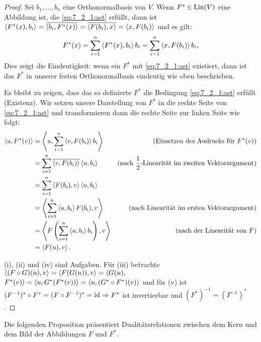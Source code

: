 \begin{proof} 
	Sei $ b_1, \ldots, b_n $ eine Orthonormalbasis von $ V $. Wenn $ F^\ast \in \operatorname{Lin}(V) $ eine Abbildung ist, die \eqref{eq:7_2_1:ast} erfüllt, dann ist $ \left\langle F^\ast(x),b_i \right\rangle = \overline{\left\langle b_i,F^\ast(x) \right\rangle} = \overline{\left\langle F(b_i),x \right\rangle} = \left\langle x,F(b_i) \right\rangle $ und es gilt:
	\begin{equation*}
		F^\ast(x) = \sum_{i=1}^{n} \left\langle F^\ast(x),b_i \right\rangle b_i = \sum_{i=1}^{n} \left\langle x,F(b_i) \right\rangle b_i,
	\end{equation*}
	Dies zeigt die Eindeutigkeit: wenn ein $F^\ast$ mit \eqref{eq:7_2_1:ast} existiert, dann ist das $F^\ast$ in unserer festen Orthonormalbasis eindeutig wie oben beschrieben. 
	
	Es bleibt zu zeigen, dass das so definierte $ F^\ast $ die Bedingung \eqref{eq:7_2_1:ast} erfüllt (Existenz). Wir setzen unsere Darstellung von $F^\ast$ in die rechte Seite von \eqref{eq:7_2_1:ast} und transformieren dann die rechte Seite zur linken Seite wie folgt: 
	\begin{align*}
		\left\langle  u , F^\ast(v)  \right\rangle & = \left\langle  u , \sum_{i=1}^n \left\langle v,F(b_i) \right\rangle b_i  \right\rangle & \text{(Einsetzen des Audrucks für $F^\ast(v)$)} 
		\\ & = \sum_{i=1}^n \overline{\left\langle v,F(b_i) \right\rangle} \left\langle u, b_i \right\rangle & \text{(nach $\frac{1}{2}$-Linearität im zweiten Vektorargument)}
		\\ & = \sum_{i=1}^n \left\langle F(b_i),v \right\rangle \left\langle u, b_i \right\rangle
		\\ & =  \left\langle \sum_{i=1}^n \left\langle u, b_i \right\rangle F(b_i),v \right\rangle & \text{(nach Linearität im ersten Vektorargument)}
		\\ & = \left\langle F \left( \sum_{i=1}^n \left\langle u, b_i \right\rangle b_i \right),v \right\rangle & \text{(nach der Linearität von $F$)}
		\\ & = \left\langle F(u),v \right\rangle.
	\end{align*}

	(i), (ii) und (iv) sind Aufgaben. Für (iii) betrachte $ \left\langle (F \circ G)(u),v \right\rangle = \left\langle F(G(u)),v \right\rangle = \langle G(u), $ $ F^\ast(v) \rangle = \left\langle u,G^\ast(F^\ast(v)) \right\rangle = \left\langle u, (G^\ast \circ F^\ast)(v) \right\rangle $ und für (v) ist $ (F^{-1})^\ast \circ F^\ast = (F \circ F^{-1})^\ast = \operatorname{id} \Rightarrow F^\ast $ ist invertierbar und $ (F^\ast)^{-1} = (F^{-1})^\ast $.
\end{proof}

Die folgenden Proposition präsentiert Dualitätsrelationen zwischen dem Kern und dem Bild der Abbildungen $F$ und $F^\ast$. 

